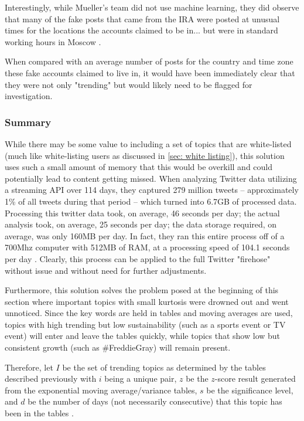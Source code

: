 \documentclass[preprint,review,12pt]{elsarticle}
\begin{document}
Interestingly, while Mueller's team did not use machine learning, they did observe that many of the fake posts that came from the IRA were posted at unusual times for the locations the accounts claimed to be in... but were in standard working hours in Moscow \cite{mueller2020internet}.

When compared with an average number of posts for the country and time zone these fake accounts claimed to live in, it would have been immediately clear that they were not only "trending" but would likely need to be flagged for investigation.

\subsubsection{Summary}
\label{what is being shared summary}
While there may be some value to including a set of topics that are white-listed (much like white-listing users as discussed in \ref{sec: white listing}), this solution uses such a small amount of memory that this would be overkill and could potentially lead to content getting missed. When analyzing Twitter data utilizing a streaming API over 114 days, they captured 279 million tweets -- approximately 1\% of all tweets during that period -- which turned into 6.7GB of processed data. Processing this twitter data took, on average, 46 seconds per day; the actual analysis took, on average, 25 seconds per day; the data storage required, on average, was only 160MB per day. In fact, they ran this entire process off of a 700Mhz computer with 512MB of RAM, at a processing speed of 104.1 seconds per day \cite{schubert2014signitrend}. Clearly, this process can be applied to the full Twitter "firehose" without issue and without need for further adjustments.

Furthermore, this solution solves the problem posed at the beginning of this section where important topics with small kurtosis were drowned out and went unnoticed. Since the key words are held in tables and moving averages are used, topics with high trending but low sustainability (such as a sports event or TV event) will enter and leave the tables quickly, while topics that show low but consistent growth (such as \#FreddieGray) will remain present. 

Therefore, let $I$ be the set of trending topics as determined by the tables described previously with $i$ being a unique pair, $z$ be the $z$-score result generated from the exponential moving average/variance tables, $s$ be the significance level, and $d$ be the number of days (not necessarily consecutive) that this topic has been in the tables .
\end{document}

